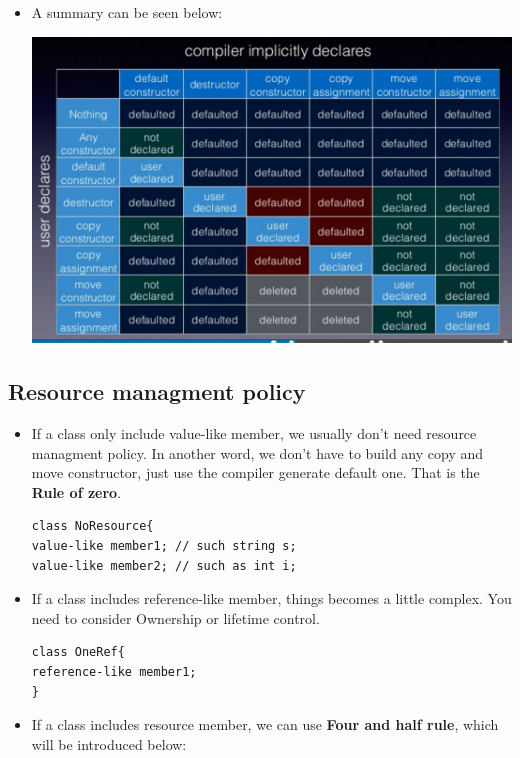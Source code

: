 \documentclass[a4paper,11pt,twoside]{book}
\begin{document}
\begin{itemize}
\item A summary can be seen below: \\
\begin{center}
	\includegraphics[scale=0.6]{pics/sm3.png} \newline
\end{center}

\end{itemize}

\subsection{Resource managment policy}
\begin{itemize}
    \item If a class only include value-like member, we usually don't need resource managment policy. In another word, 
we don't have to build any copy and move constructor, just use the compiler generate default one. That is the \textbf{Rule of zero}.
\begin{lstlisting}
class NoResource{
value-like member1; // such string s;
value-like member2; // such as int i;
\end{lstlisting}

    \item If a class includes reference-like member, things becomes a little complex. You need to consider Ownership or lifetime control. 

\begin{lstlisting}
class OneRef{
reference-like member1;
}
\end{lstlisting}

    \item If a class includes resource member, we can use \textbf{Four and half rule}, which will be introduced below:
\end{itemize}
\end{document}
